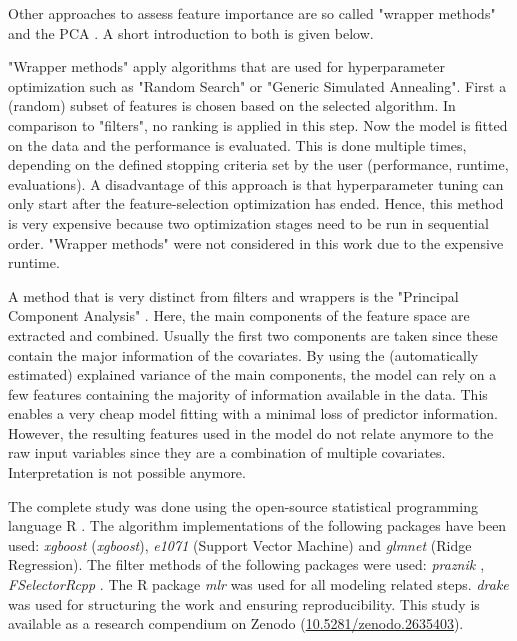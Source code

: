\documentclass[review]{elsarticle}
\begin{document}
\noindent Other approaches to assess feature importance are so called "wrapper methods" and the \ac{PCA} \citep{das2001, jolliffe2016}.
A short introduction to both is given below.

\noindent "Wrapper methods" \citep{chandrashekar2014, kohavi1997} apply algorithms that are used for hyperparameter optimization such as "Random Search" or "Generic Simulated Annealing".
First a (random) subset of features is chosen based on the selected algorithm.
In comparison to "filters", no ranking is applied in this step.
Now the model is fitted on the data and the performance is evaluated.
This is done multiple times, depending on the defined stopping criteria set by the user (performance, runtime, evaluations).
A disadvantage of this approach is that hyperparameter tuning can only start after the feature-selection optimization has ended.
Hence, this method is very expensive because two optimization stages need to be run in sequential order.
"Wrapper methods" were not considered in this work due to the expensive runtime.

A method that is very distinct from filters and wrappers is the "Principal Component Analysis" \citep{pearson1901, jolliffe2016}.
Here, the main components of the feature space are extracted and combined.
Usually the first two components are taken since these contain the major information of the covariates.
By using the (automatically estimated) explained variance of the main components, the model can rely on a few features containing the majority of information available in the data.
This enables a very cheap model fitting with a minimal loss of predictor information.
However, the resulting features used in the model do not relate anymore to the raw input variables since they are a combination of multiple covariates.
Interpretation is not possible anymore.

\noindent The complete study was done using the open-source statistical programming language R \citep{rcoreteam2018}.
The algorithm implementations of the following packages have been used: \textit{xgboost} \citep{chen2016} (\textit{xgboost}), \textit{e1071} \citep{e1071} (Support Vector Machine) and \textit{glmnet} \citep{glmnet} (Ridge Regression).
The filter methods of the following packages were used: \textit{praznik \citep{praznik}}, \textit{FSelectorRcpp} \citep{fselectorrcpp}.
The R package \textit{mlr} \citep{mlr} was used for all modeling related steps.
\textit{drake} was used for structuring the work and ensuring reproducibility.
This study is available as a research compendium on Zenodo (\url{10.5281/zenodo.2635403}).
\end{document}
